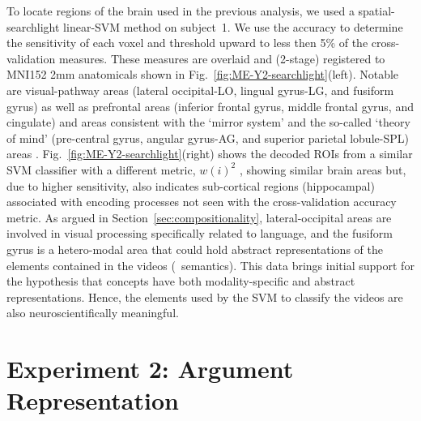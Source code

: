 To locate regions of the brain used in the previous analysis, we used a
spatial-searchlight linear-SVM method on subject~1.
%
We use the accuracy to determine the sensitivity of each voxel and threshold
upward to less then 5\% of the cross-validation measures.
%
These measures are overlaid and (2-stage) registered to MNI152 2mm
anatomicals shown in Fig.~\ref{fig:ME-Y2-searchlight}(left).
%
Notable are visual-pathway areas (lateral occipital-LO, lingual gyrus-LG, and
fusiform gyrus) as well as prefrontal areas (inferior frontal gyrus, middle
frontal gyrus, and cingulate) and areas consistent with the `mirror system'
\citep{arbib2006action} and the so-called `theory of mind' (pre-central gyrus,
angular gyrus-AG, and superior parietal lobule-SPL) areas
\citep{dronkers2004lesion,turken2011neural}.
%
Fig.~\ref{fig:ME-Y2-searchlight}(right) shows the decoded ROIs from a similar
SVM classifier with a different metric, $w(i)^2$ \citep{hanson2009}, showing
similar brain areas but, due to higher sensitivity, also indicates sub-cortical
regions (hippocampal) associated with encoding processes not seen with the
cross-validation accuracy metric.
%
As argued in Section~\ref{sec:compositionality}, lateral-occipital areas are
involved in visual processing specifically related to language, and the
fusiform gyrus is a hetero-modal area that could hold abstract representations
of the elements contained in the videos (\eg\ semantics).
%
This data brings initial support for the hypothesis that concepts have both
modality-specific and abstract representations.
%
Hence, the elements used by the SVM to classify the videos are also
neuroscientifically meaningful.

\section{Experiment 2: Argument Representation}
\label{sec:experiment2}


